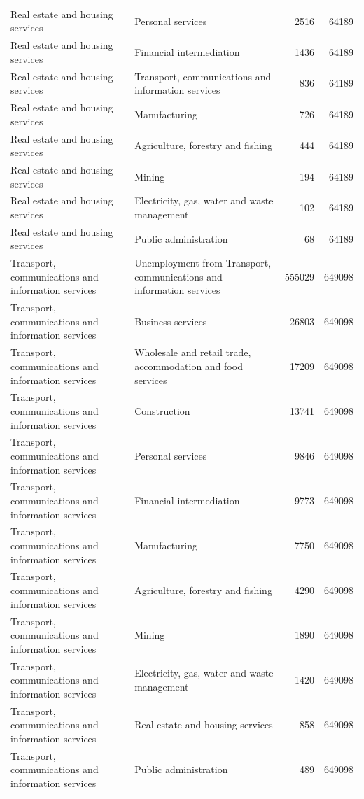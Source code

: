 \begin{longtable}{llrr}
Real estate and housing services & Personal services & 2516 & 64189 \\
Real estate and housing services & Financial intermediation & 1436 & 64189 \\
Real estate and housing services & Transport, communications and information services & 836 & 64189 \\
Real estate and housing services & Manufacturing & 726 & 64189 \\
Real estate and housing services & Agriculture, forestry and fishing & 444 & 64189 \\
Real estate and housing services & Mining & 194 & 64189 \\
Real estate and housing services & Electricity, gas, water and waste management & 102 & 64189 \\
Real estate and housing services & Public administration & 68 & 64189 \\
Transport, communications and information services & Unemployment from Transport, communications and information services & 555029 & 649098 \\
Transport, communications and information services & Business services & 26803 & 649098 \\
Transport, communications and information services & Wholesale and retail trade, accommodation and food services & 17209 & 649098 \\
Transport, communications and information services & Construction & 13741 & 649098 \\
Transport, communications and information services & Personal services & 9846 & 649098 \\
Transport, communications and information services & Financial intermediation & 9773 & 649098 \\
Transport, communications and information services & Manufacturing & 7750 & 649098 \\
Transport, communications and information services & Agriculture, forestry and fishing & 4290 & 649098 \\
Transport, communications and information services & Mining & 1890 & 649098 \\
Transport, communications and information services & Electricity, gas, water and waste management & 1420 & 649098 \\
Transport, communications and information services & Real estate and housing services & 858 & 649098 \\
Transport, communications and information services & Public administration & 489 & 649098 \\

\end{longtable}
